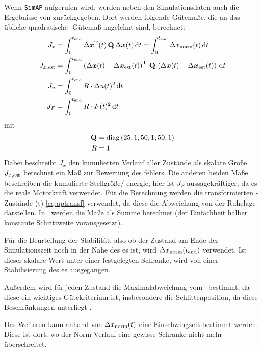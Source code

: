 Wenn \texttt{SimAP} aufgerufen wird, werden neben den Simulationsdaten auch die Ergebnisse von  zurückgegeben.
Dort werden \ua folgende Gütemaße, die an das übliche quadratische \ricc-Gütemaß angelehnt sind, berechnet:
\begin{subequations} \begin{align} 
	J_x &= \int_{0}^{t_{\mathrm{end}}} \Delta \boldsymbol{x}^{\mathrm{T}}(t) \, {\boldsymbol{\mathrm{Q}}} \, \Delta \boldsymbol{x}(t)  \, \mathrm{d} t = \int_{0}^{t_{\mathrm{end}}} \Delta x_{\mathrm{norm}}(t)  \, \mathrm{d} t  \\
	J_{x,\mathrm{est}} &= \int_{0}^{t_{\mathrm{end}}} \left(\Delta \boldsymbol{x}(t)-\Delta \boldsymbol{x}_{\mathrm{est}}(t)\right)^{\mathrm{T}}  \,{\boldsymbol{\mathrm{Q}}}  \, \left(\Delta \boldsymbol{x}(t)-\Delta \boldsymbol{x}_{\mathrm{est}}(t)\right)  \, \mathrm{d} t  \\
	J_u &= \int_{0}^{t_{\mathrm{end}}}  R \cdot \Delta u(t)^2 \, \mathrm{d} t	\\
	J_F &= \int_{0}^{t_{\mathrm{end}}}  R \cdot F(t)^2 \, \mathrm{d} t
\end{align} \end{subequations}
mit
\begin{align*}
	{\ensuremath{\boldsymbol{\mathrm{Q}}}} &= \mathrm{diag}\left(25, 1, 50, 1, 50, 1 \right) \\
	R &= 1 
\end{align*}
Dabei beschreibt $J_x$ den kumulierten Verlauf aller Zustände als skalare Größe.
$J_{x,\mathrm{est}}$ berechnet ein Maß zur Bewertung des \beob fehlers.
Die anderen beiden Maße beschreiben die kumulierte Stellgröße/-energie, hier ist $J_F$ aussagekräftiger, da es die reale Motorkraft verwendet.
Für die Berechnung werden die transformierten \ap-Zustände \dvex(t) \eqref{eq:aptransf} verwendet, da diese die Abweichung von der Ruhelage darstellen.
In \ml\ werden die Maße als Summe berechnet (der Einfachheit halber konstante Schrittweite vorausgesetzt).

Für die Beurteilung der Stabilität, also ob der Zustand am Ende der Simulationszeit noch in der Nähe des \ap es ist, wird
$\Delta x_{\mathrm{norm}}(t_{\mathrm{end}})$
verwendet. Ist dieser skalare Wert unter einer festgelegten Schranke, wird von einer Stabilisierung des \ap es ausgegangen.

Außerdem wird für jeden Zustand die Maximalabweichung vom \ap\ bestimmt, da diese ein wichtiges Gütekriterium ist, insbesondere die Schlittenposition, da diese Beschränkungen unterliegt .

Des Weiteren kann anhand von $\Delta x_{\mathrm{norm}}(t)$ eine Einschwingzeit bestimmt werden.
Diese ist dort, wo der Norm-Verlauf eine gewisse Schranke nicht mehr überschreitet.


\subsection{\xots}\label{subsec:awts}


